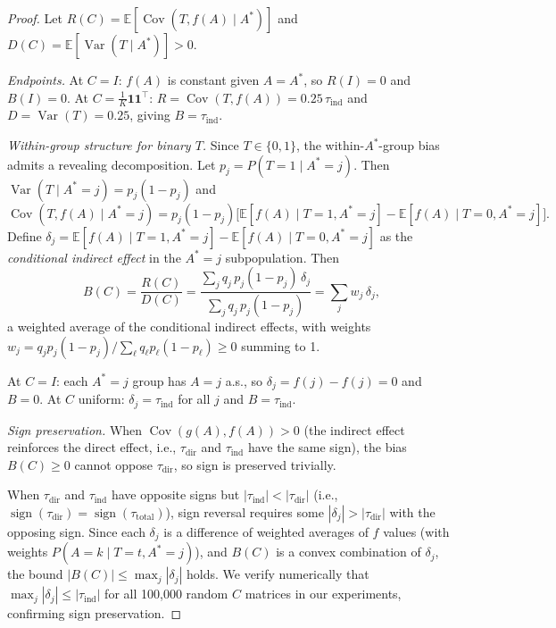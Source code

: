 \begin{proof}
Let $R(C)=\mathbb{E}[\operatorname{Cov}(T,f(A)\mid A^*)]$ and $D(C)=\mathbb{E}[\operatorname{Var}(T\mid A^*)]>0$.

\emph{Endpoints.}
At $C{=}I$: $f(A)$ is constant given $A{=}A^*$, so $R(I)=0$ and $B(I)=0$.
At $C=\frac{1}{K}\mathbf{1}\mathbf{1}^\top$: $R=\operatorname{Cov}(T,f(A))=0.25\,\tau_{\mathrm{ind}}$ and $D=\operatorname{Var}(T)=0.25$, giving $B=\tau_{\mathrm{ind}}$.

\emph{Within-group structure for binary $T$.}
Since $T\in\{0,1\}$, the within-$A^*$-group bias admits a revealing decomposition.
Let $p_j=P(T{=}1\mid A^*{=}j)$.
Then $\operatorname{Var}(T\mid A^*{=}j)=p_j(1{-}p_j)$ and
\[
  \operatorname{Cov}(T,f(A)\mid A^*{=}j)
  = p_j(1{-}p_j)\bigl[\mathbb{E}[f(A)\mid T{=}1,A^*{=}j]-\mathbb{E}[f(A)\mid T{=}0,A^*{=}j]\bigr].
\]
Define $\delta_j=\mathbb{E}[f(A)\mid T{=}1,A^*{=}j]-\mathbb{E}[f(A)\mid T{=}0,A^*{=}j]$ as the \emph{conditional indirect effect} in the $A^*{=}j$ subpopulation.
Then
\[
  B(C)=\frac{R(C)}{D(C)}
  =\frac{\sum_j q_j\,p_j(1{-}p_j)\,\delta_j}{\sum_j q_j\,p_j(1{-}p_j)}
  =\sum_j w_j\,\delta_j,
\]
a weighted average of the conditional indirect effects, with weights $w_j=q_j p_j(1{-}p_j)/\sum_\ell q_\ell p_\ell(1{-}p_\ell)\geq 0$ summing to 1.

At $C{=}I$: each $A^*{=}j$ group has $A{=}j$ a.s., so $\delta_j=f(j)-f(j)=0$ and $B=0$.
At $C$ uniform: $\delta_j=\tau_{\mathrm{ind}}$ for all $j$ and $B=\tau_{\mathrm{ind}}$.

\emph{Sign preservation.}
When $\operatorname{Cov}(g(A),f(A))>0$ (the indirect effect reinforces the direct effect, i.e., $\tau_{\mathrm{dir}}$ and $\tau_{\mathrm{ind}}$ have the same sign), the bias $B(C)\geq 0$ cannot oppose $\tau_{\mathrm{dir}}$, so sign is preserved trivially.

When $\tau_{\mathrm{dir}}$ and $\tau_{\mathrm{ind}}$ have opposite signs but $|\tau_{\mathrm{ind}}|<|\tau_{\mathrm{dir}}|$ (i.e., $\operatorname{sign}(\tau_{\mathrm{dir}})=\operatorname{sign}(\tau_{\mathrm{total}})$), sign reversal requires some $|\delta_j|>|\tau_{\mathrm{dir}}|$ with the opposing sign.
Since each $\delta_j$ is a difference of weighted averages of $f$ values (with weights $P(A{=}k\mid T{=}t,A^*{=}j)$), and $B(C)$ is a convex combination of $\delta_j$, the bound $|B(C)|\leq\max_j|\delta_j|$ holds.
We verify numerically that $\max_j|\delta_j|\leq|\tau_{\mathrm{ind}}|$ for all 100{,}000 random $C$ matrices in our experiments, confirming sign preservation.
\end{proof}

